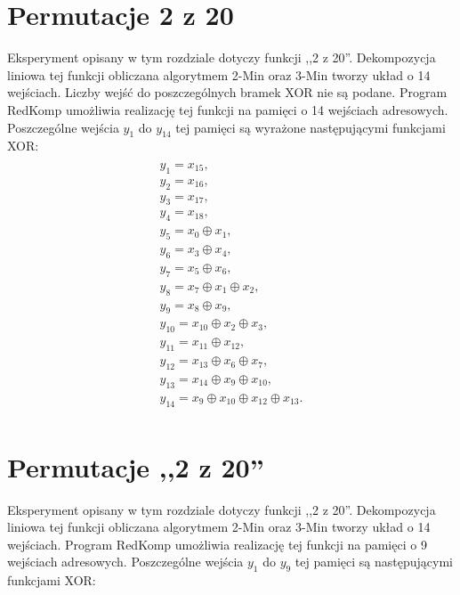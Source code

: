 \section{Permutacje 2 z 20}

Eksperyment opisany w tym rozdziale dotyczy funkcji ,,2 z 20''.
Dekompozycja liniowa tej funkcji obliczana algorytmem 2-Min oraz 3-Min \cite{sasao-s-min} tworzy układ o 14 wejściach.
Liczby wejść do poszczególnych bramek XOR nie są podane.
Program RedKomp umożliwia realizację tej funkcji na pamięci o 14 wejściach adresowych.
Poszczególne wejścia $y_1$ do $y_{14}$ tej pamięci są wyrażone następującymi funkcjami XOR:
\begin{multline} \\
y_1 = x_{15}, \\
y_2 = x_{16}, \\
y_3 = x_{17}, \\
y_4 = x_{18}, \\
y_5 = x_0 \oplus x_1, \\
y_6 = x_3 \oplus x_4, \\
y_7 = x_5 \oplus x_6, \\
y_8 = x_7 \oplus x_1 \oplus x_2, \\
y_9 = x_8 \oplus x_9, \\
y_{10} = x_{10} \oplus x_2 \oplus x_3, \\
y_{11} = x_{11} \oplus x_{12}, \\
y_{12} = x_{13} \oplus x_6 \oplus x_7, \\
y_{13} = x_{14} \oplus x_9 \oplus x_{10}, \\
y_{14} = x_9 \oplus x_{10} \oplus x_{12} \oplus x_{13}. \\
\end{multline}

\section{Permutacje ,,2 z 20''}

Eksperyment opisany w tym rozdziale dotyczy funkcji ,,2 z 20''.
Dekompozycja liniowa tej funkcji obliczana algorytmem 2-Min oraz 3-Min \cite{sasao-s-min} tworzy układ o 14 wejściach.
Program RedKomp umożliwia realizację tej funkcji na pamięci o 9 wejściach adresowych.
Poszczególne wejścia $y_1$ do $y_9$ tej pamięci są następującymi funkcjami XOR:

